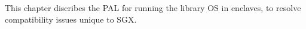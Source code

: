 This chapter discribes the PAL for running the \graphene{} library OS
in enclaves,
to resolve compatibility issues unique to SGX.


